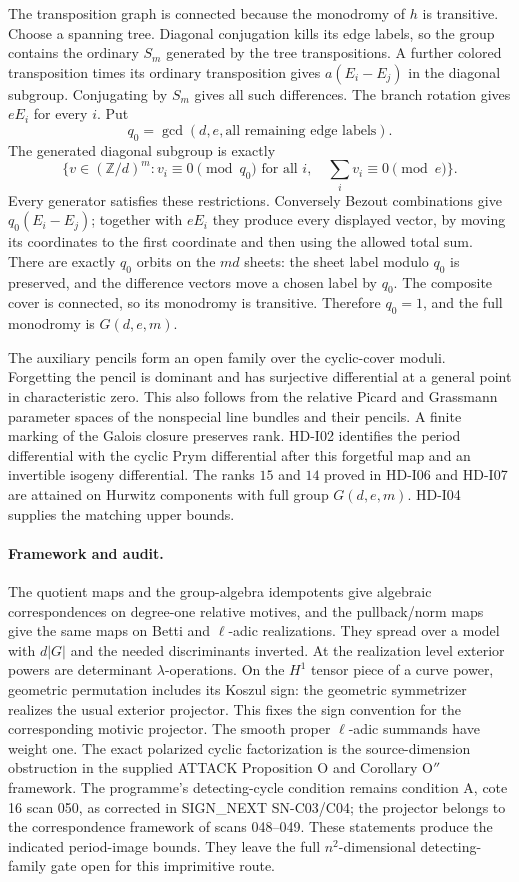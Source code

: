 The transposition graph is connected because the monodromy of $h$
is transitive. Choose a spanning tree. Diagonal conjugation kills its
edge labels, so the group contains the ordinary $S_m$ generated by
the tree transpositions. A further colored transposition times its
ordinary transposition gives $a(E_i-E_j)$ in the diagonal subgroup.
Conjugating by $S_m$ gives all such differences. The branch rotation
gives $eE_i$ for every $i$. Put
\[
q_0=\gcd(d,e,\text{all remaining edge labels}).
\]
The generated diagonal subgroup is exactly
\[
\{v\in(\mathbb Z/d)^m:
 v_i\equiv0\pmod{q_0}\text{ for all }i,\quad
 \sum_i v_i\equiv0\pmod e\}.
\]
Every generator satisfies these restrictions. Conversely Bezout
combinations give $q_0(E_i-E_j)$; together with $eE_i$ they produce
every displayed vector, by moving its coordinates to the first
coordinate and then using the allowed total sum. There are exactly
$q_0$ orbits on the $md$ sheets: the sheet label modulo $q_0$ is
preserved, and the difference vectors move a chosen label by $q_0$.
The composite cover is connected, so its monodromy is transitive.
Therefore $q_0=1$, and the full monodromy is $G(d,e,m)$.

The auxiliary pencils form an open family over the cyclic-cover
moduli. Forgetting the pencil is dominant and has surjective
differential at a general point in characteristic zero. This also
follows from the relative Picard and Grassmann parameter spaces of
the nonspecial line bundles and their pencils. A finite marking of
the Galois closure preserves rank. HD-I02 identifies the period
differential with the cyclic Prym differential after this forgetful
map and an invertible isogeny differential. The ranks $15$ and $14$
proved in HD-I06 and HD-I07 are attained on Hurwitz components with
full group $G(d,e,m)$. HD-I04 supplies the matching upper bounds.

\paragraph{Framework and audit.}
The quotient maps and the group-algebra idempotents give algebraic
correspondences on degree-one relative motives, and the pullback/norm
maps give the same maps on Betti and $\ell$-adic realizations. They
spread over a model with $d|G|$ and the needed discriminants inverted.
At the realization level exterior powers are determinant
$\lambda$-operations. On the $H^1$ tensor piece of a curve power,
geometric permutation includes its Koszul sign: the geometric
symmetrizer realizes the usual exterior projector. This fixes the
sign convention for the corresponding motivic projector.
The smooth proper $\ell$-adic summands have weight one. The exact
polarized cyclic factorization is the source-dimension obstruction
in the supplied ATTACK Proposition O and Corollary O$''$ framework.
The programme's detecting-cycle condition remains condition A,
cote 16 scan 050, as corrected in SIGN\_NEXT SN-C03/C04; the
projector belongs to the correspondence framework of scans
048--049. These statements produce the indicated period-image bounds.
They leave the full $n^2$-dimensional detecting-family gate open for
this imprimitive route.

